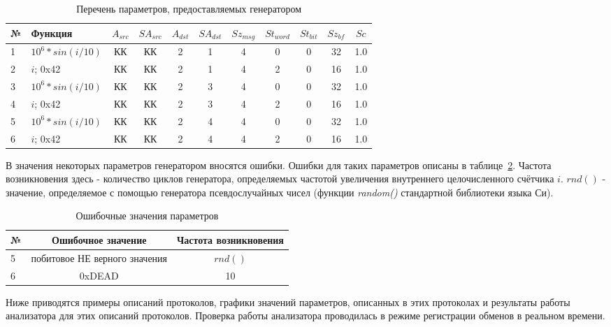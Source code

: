 \begin{table}[H]
\centering
\begin{tabular}{|l|l|*{9}{c|}}
\hline
 № & Функция & $A_{src}$ & $SA_{src}$ & $A_{dst}$ & $SA_{dst}$ & $Sz_{msg}$ & 
$St_{word}$ & $St_{bit}$ & $Sz_{bf}$ & $Sc$ \\
\hline
1 & $10^6 * sin(i / 10)$ & КК & КК & 2 & 1 & 4 & 0 & 0 & 32 & 1.0 \\
2 & $i$; 0x42 & КК & КК & 2 & 1 & 4 & 2 & 0 & 16 & 1.0 \\
3 & $10^6 * sin(i / 10)$ & КК & КК & 2 & 3 & 4 & 0 & 0 & 32 & 1.0 \\
4 & $i$; 0x42 & КК & КК & 2 & 3 & 4 & 2 & 0 & 16 & 1.0 \\
5 & $10^6 * sin(i / 10)$ & КК & КК & 2 & 4 & 4 & 0 & 0 & 32 & 1.0 \\
6 & $i$; 0x42 & КК & КК & 2 & 4 & 4 & 2 & 0 & 16 & 1.0 \\
\hline 
\end{tabular}
\caption{Перечень параметров, предоставляемых генератором}
\label{tab:params}
\end{table}

В значения некоторых параметров генератором вносятся ошибки. Ошибки 
для таких параметров описаны в таблице~\ref{tab:param_errors}. Частота 
возникновения здесь - количество циклов генератора, определяемых частотой 
увеличения внутреннего целочисленного счётчика $i$. $rnd()$ - значение, 
определяемое с помощью генератора псевдослучайных чисел (функции 
\textit{random()} стандартной библиотеки языка Си).

\begin{table}[H]
 \centering
 \begin{tabular}{|l|c|c|}
  \hline
  № & Ошибочное значение & Частота возникновения \\
  \hline
  5 & побитовое НЕ верного значения & $rnd()$ \\
  6 & 0xDEAD & 10 \\
  \hline
 \end{tabular}
 \caption{Ошибочные значения параметров}
 \label{tab:param_errors}
\end{table}



Ниже приводятся примеры описаний протоколов, графики значений параметров, 
описанных в этих протоколах и результаты работы анализатора для этих 
описаний протоколов. Проверка работы анализатора проводилась в режиме 
регистрации обменов в реальном времени.

